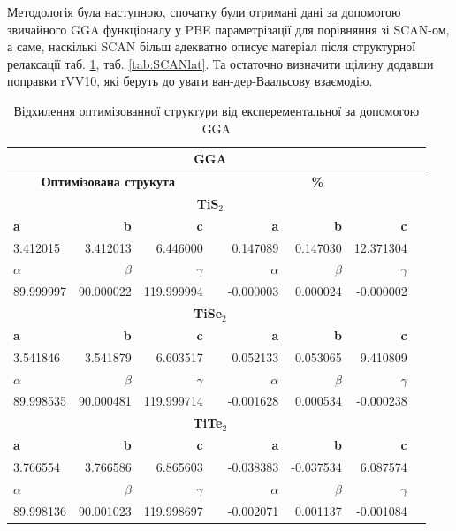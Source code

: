 Методологія була наступною, спочатку були отримані дані за допомогою звичайного GGA функціоналу у PBE параметрізації для порівняння зі SCAN-ом, а саме, наскількі SCAN більш адекватно описує матеріал після структурної релаксації таб. \ref{tab:GGAlat}, таб. \ref{tab:SCANlat}. Та остаточно визначити щілину додавши поправки rVV10, які беруть до уваги ван-дер-Ваальсову взаємодію.

\begin{table}[!htp]\centering
\scriptsize
\begin{tabular}{lrrrrrrr}\toprule
\multicolumn{7}{c}{\textbf{GGA}} \\\midrule
\multicolumn{3}{c}{\textbf{Оптимізована струкута}} & &\multicolumn{3}{c}{\textbf{\%}} \\
\multicolumn{7}{c}{\textbf{TiS$_2$}} \\
\textbf{a} &\textbf{b} &\textbf{c} & &\textbf{a} &\textbf{b} &\textbf{c} \\
3.412015 &3.412013 &6.446000 & &0.147089 &0.147030 &12.371304 \\
\textbf{$\alpha$} &\textbf{$\beta$} &\textbf{$\gamma$} & &\textbf{$\alpha$} &\textbf{$\beta$} &\textbf{$\gamma$} \\
89.999997 &90.000022 &119.999994 & &-0.000003 &0.000024 &-0.000002 \\
\multicolumn{7}{c}{\textbf{TiSe$_2$}} \\
\textbf{a} &\textbf{b} &\textbf{c} & &\textbf{a} &\textbf{b} &\textbf{c} \\
3.541846 &3.541879 &6.603517 & &0.052133 &0.053065 &9.410809 \\
\textbf{$\alpha$} &\textbf{$\beta$} &\textbf{$\gamma$} & &\textbf{$\alpha$} &\textbf{$\beta$} &\textbf{$\gamma$} \\
89.998535 &90.000481 &119.999714 & &-0.001628 &0.000534 &-0.000238 \\
\multicolumn{7}{c}{\textbf{TiTe$_2$}} \\
\textbf{a} &\textbf{b} &\textbf{c} & &\textbf{a} &\textbf{b} &\textbf{c} \\
3.766554 &3.766586 &6.865603 & &-0.038383 &-0.037534 &6.087574 \\
\textbf{$\alpha$} &\textbf{$\beta$} &\textbf{$\gamma$} & &\textbf{$\alpha$} &\textbf{$\beta$} &\textbf{$\gamma$} \\
89.998136 &90.001023 &119.998697 & &-0.002071 &0.001137 &-0.001084 \\
\bottomrule
\end{tabular}
\caption{Відхилення оптимізованної структури від експерементальної за допомогою GGA}\label{tab:GGAlat}
\end{table}


